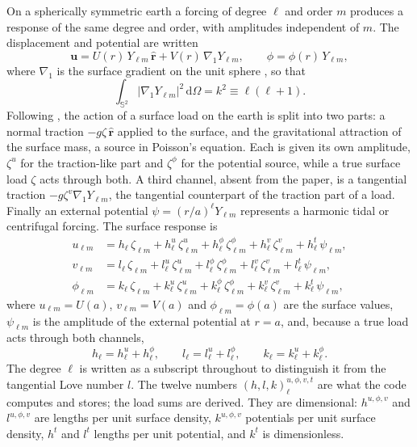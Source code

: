 \documentclass[11pt,a4paper]{article}
\newcommand{\dd}{\mathrm{d}}
\newcommand{\rhat}{\hat{\mathbf{r}}}
\newcommand{\uu}{\mathbf{u}}
\newcommand{\gradone}{\nabla_{1}}
\newcommand{\Ylm}{Y_{\ell m}}
\newcommand{\sph}{\mathbb{S}^2}
\numberwithin{equation}{section}
\begin{document}
On a spherically symmetric earth a forcing of degree $\ell$ and order $m$
produces a response of the same degree and order, with amplitudes independent
of $m$. The displacement and potential are written
\begin{equation}
\uu = U(r)\,\Ylm\,\rhat + V(r)\,\gradone\Ylm,\qquad \phi = \phi(r)\,\Ylm,
\label{eq:spheroidal}
\end{equation}
where $\gradone$ is the surface gradient on the unit sphere
\citep{DahlenTromp1998}, so that
\begin{equation}
\int_{\sph}|\gradone\Ylm|^{2}\,\dd\Omega = k^{2}\equiv\ell(\ell+1).
\end{equation}
Following
\citet[eq.~62]{AlAttarEtAl2024}, the action of a surface load on the earth is
split into two parts: a normal traction $-g\zeta\,\rhat$ applied to the
surface, and the gravitational attraction of the surface mass, a source in
Poisson's equation. Each is given its own amplitude, $\zeta^{u}$ for the
traction-like part and $\zeta^{\phi}$ for the potential source, while a true
surface load $\zeta$ acts through both. A third channel, absent from the
paper, is a tangential traction $-g\zeta^{v}\gradone\Ylm$, the tangential
counterpart of the traction part of a load. Finally an external potential
$\psi=(r/a)^{\ell}\Ylm$ represents a harmonic tidal or centrifugal forcing. The
surface response is
\begin{equation}
\begin{aligned}
u_{\ell m} &= h_{\ell}\,\zeta_{\ell m} + h^{u}_{\ell}\,\zeta^{u}_{\ell m}
 + h^{\phi}_{\ell}\,\zeta^{\phi}_{\ell m} + h^{v}_{\ell}\,\zeta^{v}_{\ell m}
 + h^{t}_{\ell}\,\psi_{\ell m},\\
v_{\ell m} &= l_{\ell}\,\zeta_{\ell m} + l^{u}_{\ell}\,\zeta^{u}_{\ell m}
 + l^{\phi}_{\ell}\,\zeta^{\phi}_{\ell m} + l^{v}_{\ell}\,\zeta^{v}_{\ell m}
 + l^{t}_{\ell}\,\psi_{\ell m},\\
\phi_{\ell m} &= k_{\ell}\,\zeta_{\ell m} + k^{u}_{\ell}\,\zeta^{u}_{\ell m}
 + k^{\phi}_{\ell}\,\zeta^{\phi}_{\ell m} + k^{v}_{\ell}\,\zeta^{v}_{\ell m}
 + k^{t}_{\ell}\,\psi_{\ell m},
\end{aligned}
\label{eq:generalised}
\end{equation}
where $u_{\ell m}=U(a)$, $v_{\ell m}=V(a)$ and $\phi_{\ell m}=\phi(a)$ are the
surface values, $\psi_{\ell m}$ is the amplitude of the external potential at
$r=a$, and, because a true load acts through both channels,
\begin{equation}
h_{\ell} = h^{u}_{\ell}+h^{\phi}_{\ell},\qquad
l_{\ell} = l^{u}_{\ell}+l^{\phi}_{\ell},\qquad
k_{\ell} = k^{u}_{\ell}+k^{\phi}_{\ell}.
\end{equation}
The degree $\ell$ is written as a subscript throughout to distinguish it from
the tangential Love number $l$. The twelve numbers
$(h,l,k)^{u,\phi,v,t}_{\ell}$ are what the code computes and stores; the load
sums are derived. They are dimensional: $h^{u,\phi,v}$ and $l^{u,\phi,v}$ are
lengths per unit surface density, $k^{u,\phi,v}$ potentials per unit surface
density, $h^{t}$ and $l^{t}$ lengths per unit potential, and $k^{t}$ is
dimensionless.
\end{document}
